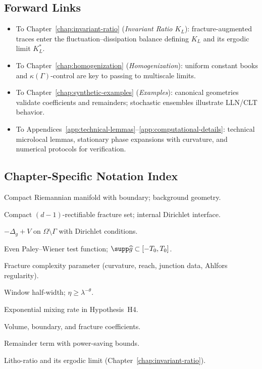 \subsection{Forward Links}
\label{subsec:05-forward}
\begin{itemize}
  \item To Chapter~\ref{chap:invariant-ratio} (\emph{Invariant Ratio $K_L$}):
  fracture-augmented traces enter the fluctuation–dissipation balance defining
  $K_L$ and its ergodic limit $K_L^*$.
  \item To Chapter~\ref{chap:homogenization} (\emph{Homogenization}):
  uniform constant books and $\kappa(\Gamma)$-control are key to passing to
  multiscale limits.
  \item To Chapter~\ref{chap:synthetic-examples} (\emph{Examples}):
  canonical geometries validate coefficients and remainders; stochastic ensembles
  illustrate LLN/CLT behavior.
  \item To Appendices~\ref{app:technical-lemmas}–\ref{app:computational-details}:
  technical microlocal lemmas, stationary phase expansions with curvature, and
  numerical protocols for verification.
\end{itemize}

\subsection{Chapter-Specific Notation Index}
\label{subsec:05-notation}
\begin{description}[style=unboxed,leftmargin=0cm]
  \item[$\Omega$] Compact Riemannian manifold with boundary; background geometry.
  \item[$\Gamma$] Compact $(d-1)$-rectifiable fracture set; internal Dirichlet interface.
  \item[$\mathcal{A}_{\Omega,\Gamma}$] $-\Delta_g+V$ on $\Omega\setminus\Gamma$ with Dirichlet conditions.
  \item[$g$] Even Paley–Wiener test function; $\supp\widehat g\subset[-T_0,T_0]$.
  \item[$\kappa(\Gamma)$] Fracture complexity parameter (curvature, reach, junction data, Ahlfors regularity).
  \item[$\eta$] Window half-width; $\eta\ge \lambda^{-\theta}$.
  \item[$\beta$] Exponential mixing rate in Hypothesis~H4.
  \item[$a_0,a_1,a_\Gamma$] Volume, boundary, and fracture coefficients.
  \item[$\mathcal{R}$] Remainder term with power-saving bounds.
  \item[$K_L,K_L^*$] Litho-ratio and its ergodic limit (Chapter~\ref{chap:invariant-ratio}).
\end{description}

